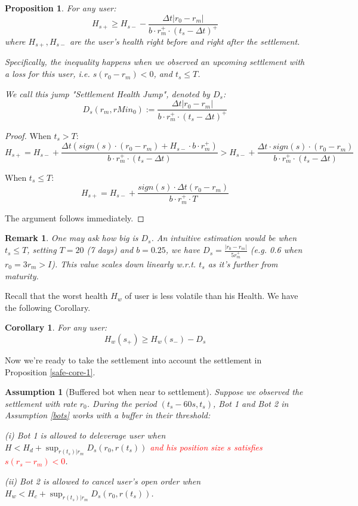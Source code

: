 \documentclass[notitlepage,reqno,11pt]{amsart}
\numberwithin{equation}{section}
\newtheorem{assumption}{Assumption}[section]
\newtheorem{coro}{Corollary}[section]
\newtheorem{prop}{Proposition}[section]
\newtheorem{remark}{Remark}[section]
\begin{document}
\begin{prop}
    For any user:
    $$
    H_{s+} \geq H_{s-} - \frac{\Delta t |r_0 - r_m|}{b \cdot r_m^+ \cdot (t_s-\Delta t)^+}
    $$
    where $H_{s+}, H_{s-}$ are the user's health right before and right after the settlement.

    Specifically, the inequality happens when we observed an upcoming settlement with a loss for this user, i.e. $s(r_0-r_m) < 0$, and $t_s \leq T$.

    We call this jump "Settlement Health Jump", denoted by $D_s$:
    $$
    D_s(r_m, r Min_0) := \frac{\Delta t |r_0 - r_m|}{b \cdot r_m^+ \cdot (t_s-\Delta t)^+}
    $$
\end{prop}
\begin{proof}
When $t_s > T$:
$$
H_{s+} = H_{s-} + \frac{\Delta t (sign(s) \cdot (r_0-r_m) + H_{s-} \cdot b \cdot r_m^+)}{b \cdot r_m^+ \cdot (t_s - \Delta t)} > H_{s-} + \frac{\Delta t \cdot sign(s) \cdot (r_0-r_m)}{b \cdot r_m^+ \cdot (t_s - \Delta t)}
$$

When $t_s \leq T$:
$$
H_{s+}  = H_{s-} + \frac{sign(s) \cdot \Delta t (r_0 - r_m)}{b \cdot r_m^+ \cdot T}
$$

The argument follows immediately.
\end{proof}

\begin{remark}
    One may ask how big is $D_s$. An intuitive estimation would be when $t_s \leq T$, setting $T = 20$ (7 days) and $b = 0.25$, we have $D_s=\frac{|r_0 -r_m|}{5r_m^+}$ (e.g. 0.6 when $r_0 = 3r_m > I$). This value scales down linearly w.r.t. $t_s$ as it's further from maturity. 
\end{remark}

Recall that the worst health $H_w$ of user is less volatile than his Health. We have the following Corollary.

\begin{coro} For any user: 
$$
H_w(s_+) \geq H_w(s_-) - D_s
$$
\end{coro}

Now we're ready to take the settlement into account the settlement in Proposition \ref{safe-core-1}.

\begin{assumption}[Buffered bot when near to settlement]\label{bots-settle}
    Suppose we observed the settlement with rate $r_0$. During the period $(t_s-60s, t_s)$, Bot 1 and Bot 2 in Assumption \ref{bots} works with a buffer in their threshold:
    
    (i) Bot 1 is allowed to deleverage user when $H < H_d + \sup_{r(t_s)|r_m}D_s(r_0, r(t_s))$ \textcolor{red}{and his position size $s$ satisfies $s(r_s-r_m) < 0$}.
    
    (ii) Bot 2 is allowed to cancel user's open order when $H_w < H_c + \sup_{r(t_s)|r_m}D_s(r_0, r(t_s))$. 
\end{assumption}
\end{document}
